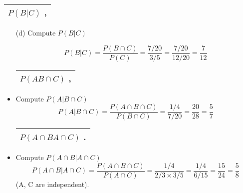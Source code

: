 \documentclass[a4paper,12pt]{article}
\begin{document}

\begin{table}[ht!]
 \centering
 \begin{tabular}{|p{15cm}|}
 \hline
\noindent 
$P (B | C)$ ,
\\ \hline
  \end{tabular}
\end{table}
\begin{itemize}
\item[(d)] Compute $P (B | C)$

\[
P (B | C) = \frac{P( B \cap C)}{P (C)} = \frac{7/20}{3/5} = \frac{7/20}{12/20} = \frac{7}{12}\]
\begin{table}[ht!]
 \centering
 \begin{tabular}{|p{15cm}|}
 \hline
\noindent  $P( A B\cap C)$ ,


\\ \hline
  \end{tabular}
\end{table}

\item Compute $P (A | B  \cap C)$ 
\[
P (A | B  \cap C) = \frac{P( A \cap B \cap C)}{P (B \cap C)} = \frac{1/4}{7/20} = \frac{20}{28} = \frac{5}{7}\]

\begin{table}[ht!]
 \centering
 \begin{tabular}{|p{15cm}|}
 \hline
\noindent 

 $P( A\cap B A\cap C)$ .
\\ \hline
  \end{tabular}
\end{table}


\item Compute $P (A \cap B | A \cap C)$ 
\[
P (A \cap B | A \cap C) = \frac{P( A \cap B \cap C)}{P (A \cap C)} = \frac{1/4}{2/3 \times 3/5} = \frac{1/4}{6/15} = \frac{15}{24} = \frac{5}{8}\]
(A, C are independent).
\end{itemize}
\end{document}
